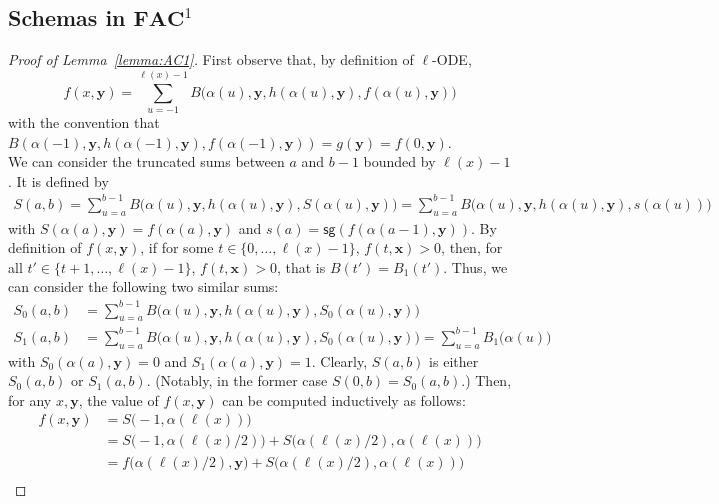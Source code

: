 \documentclass[11pt, oneside]{article}
\newenvironment{toappendix}{}{}
\newcommand{\fun}[1]{\mathsf{#1}}
\newcommand{\AC}{\mathbf{FAC}}
\newcommand{\tu}[1]{\mathbf{#1}}
\theoremstyle{definition}
\begin{document}
\begin{toappendix}
\subsection{Schemas in $\AC^1$}\label{appendix:AC}
\begin{proof}[Proof of Lemma~\ref{lemma:AC1}]
First observe that, by definition of $\ell$-ODE, 
    $$
    f(x, \tu y) = \sum^{\ell(x)-1}_{u=-1} B\big(\alpha(u), \tu y, h(\alpha(u), \tu y), f(\alpha(u), \tu y)\big)
    $$
    with the convention that $B(\alpha(-1), \tu y, h(\alpha(-1), \tu y), f(\alpha(-1), \tu y))=g(\tu y)=f(0, \tu y)$.
    \\
    We can consider the truncated sums between $a$ and $b-1$ bounded by $\ell(x)-1$.
    It is defined by
    \begin{align*}
        S(a,b) = \sum^{b-1}_{u=a} B\big(\alpha(u), \tu y, h(\alpha(u), \tu y), S(\alpha(u), \tu y)\big) 
        = \sum^{b-1}_{u=a} B\big(\alpha(u), \tu y, h(\alpha(u), \tu y), s(\alpha(u))\big)
    \end{align*}
    with $S(\alpha(a), \tu y) = f(\alpha(a), \tu y)$ and $s(a)=\fun{sg}(f(\alpha(a-1), \tu y))$.
    By definition of $f(x, \tu y)$, if for some $t\in \{0, \dots, \ell(x)-1\}$, $f(t, \tu x)>0$, then, for all $t'\in \{t+1, \dots, \ell(x)-1\}$, $f(t, \tu x)>0$, that is $B(t')=B_1(t')$.
    Thus, we can consider the following two similar sums:
    \begin{align*}
        S_0(a,b) &= \sum^{b-1}_{u=a} B\big(\alpha(u), \tu y, h(\alpha(u), \tu y), S_0(\alpha(u), \tu y)\big) \\
        S_1(a,b) &= \sum^{b-1}_{u=a} B\big(\alpha(u), \tu y, h(\alpha(u), \tu y), S_0(\alpha(u), \tu y)\big) = \sum^{b-1}_{u=a} B_1\big(\alpha(u)\big)
    \end{align*}
    with $S_0(\alpha(a), \tu y)=0$ and $S_1(\alpha(a), \tu y)=1$.
    Clearly, $S(a,b)$ is either $S_0(a,b)$ or $S_1(a, b)$. 
    (Notably, in the former case $S(0, b)=S_0(a,b)$.)
    Then, for any $x, \tu y$, the value of $f(x, \tu y)$ can be computed inductively as follows:
    \begin{align*}
        f(x, \tu y) &= S\big(-1, \alpha(\ell(x))\big) \\
        &= S\big(-1, \alpha(\ell(x)/2)\big) + S\big(\alpha(\ell(x)/2), \alpha(\ell(x))\big) \\
        &= f\big(\alpha(\ell(x)/2), \tu y\big) + S\big(\alpha(\ell(x)/2), \alpha(\ell(x))\big) \\

\end{align*}
\end{proof}
\end{toappendix}
\end{document}
